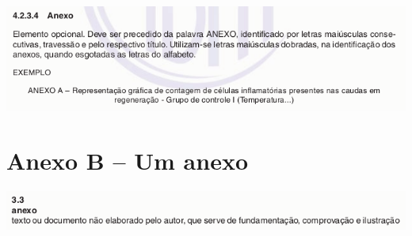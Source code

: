 \begin{center}
	\includegraphics[scale=.60]{./img/anexo-img1.png}
\end{center}

\chapter*{Anexo B -- Um anexo}

\begin{center}
	\includegraphics[scale=.60]{./img/anexo-img.png}
\end{center}


